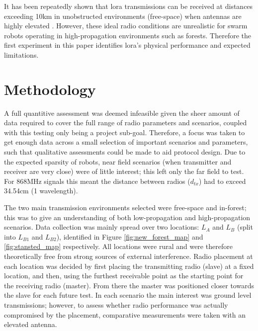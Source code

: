 It has been repeatedly shown that \ac{lora} transmissions can be received at distances exceeding 10km in  unobstructed environments (free-space) when antennas are highly elevated \cite{3YP:LORA_RANGE_REVIEW}. However, these ideal radio conditions are unrealistic for swarm robots operating in high-propagation environments such as forests. Therefore the first experiment in this paper identifies \ac{lora}'s physical performance and expected limitations. 

\section{Methodology}
A full quantitive assessment was deemed infeasible given the sheer amount of data required to cover the full range of radio parameters and scenarios, coupled with this testing only being a project sub-goal. Therefore, a focus was taken to get enough data across a small selection of important scenarios and parameters, such that qualitative assessments could be made to aid protocol design. Due to the expected sparsity of robots, near field scenarios (when transmitter and receiver are very close) were of little interest; this left only the far field to test. For 868MHz signals this meant the distance between radios ($d_{tx}$) had to exceed 34.54cm (1 wavelength). 

 The two main transmission environments selected were free-space and in-forest; this was to give an understanding of both low-propagation and high-propagation scenarios. Data collection was mainly spread over two locations: \textbf{$L_{A}$} and \textbf{$L_{B}$} (split into \textbf{$L_{B1}$} and \textbf{$L_{B2}$}), identified in Figure \ref{fig:new_forest_map} and \ref{fig:stansted_map} respectively. All locations were rural and were therefore theoretically free from strong sources of external interference. Radio placement at each location was decided by first placing the transmitting radio (slave) at a fixed location, and then, using the furthest receivable point as the starting point for the receiving radio (master). From there the master was positioned closer towards the slave for each future test. In each scenario the main interest was ground level transmissions; however, to assess whether radio performance was actually compromised by the placement, comparative measurements were taken with an elevated antenna. 
 
